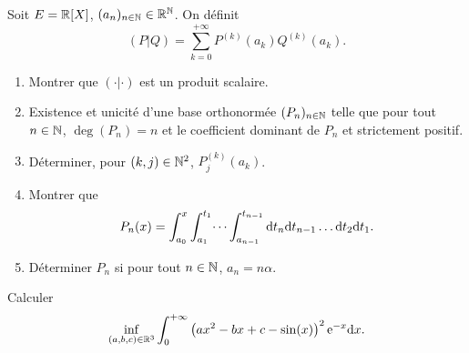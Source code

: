 \documentclass[12pt]{article}
\begin{document}
\begin{exercise}
	Soit $E=\mathbb{R}[X]$, $(a_n)_{n\in\mathbb{N}}\in\mathbb{R}^{\mathbb{N}}$. On définit 
	\begin{equation}
		(P|Q)=\sum_{k=0}^{+\infty}P^{(k)}(a_k)Q^{(k)}(a_k).
	\end{equation}
	\begin{enumerate}
		\item Montrer que $(\cdot|\cdot)$ est un produit scalaire.
		\item Existence et unicité d'une base orthonormée $(P_n)_{n\in\mathbb{N}}$ telle que pour tout $n\in\mathbb{N}$, $\deg(P_n)=n$ et le coefficient dominant de $P_n$ et strictement positif.
		\item Déterminer, pour $(k,j)\in\mathbb{N}^{2}$, $P_j^{(k)}(a_k)$.
		\item Montrer que 
		\begin{equation}
			P_n(x)=\int_{a_{0}}^{x}\int_{a_1}^{t_1}\dots\int_{a_{n-1}}^{t_{n-1}}\mathrm{d} t_{n}\mathrm{d} t_{n-1}\dots\mathrm{d} t_{2}\mathrm{d} t_{1}.
		\end{equation}
		\item Déterminer $P_n$ si pour tout $n\in\mathbb{N}$, $a_n=n\alpha$.
	\end{enumerate}
\end{exercise}

\begin{exercise}
	Calculer 
	\begin{equation}
		\inf\limits_{(a,b,c)\in\mathbb{R}^{3}}\int_{0}^{+\infty}\left(ax^{2}-bx+c-\sin(x)\right)^{2}\mathrm{e}^{-x}\mathrm{d} x.
	\end{equation}
\end{exercise}
\end{document}
